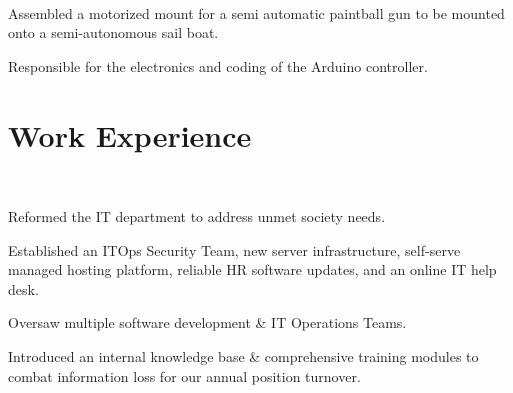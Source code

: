 \documentclass[]{hieudo-build}
\begin{document}
\begin{minipage}[t]{0.69\textwidth}
 \\
\begin{tightemize}
\item Assembled a motorized mount for a semi automatic paintball gun to be mounted onto a semi-autonomous sail boat.
\item Responsible for the electronics and coding of the Arduino controller.
\end{tightemize}
\sectionsep



\section{Work Experience}

 \\
\begin{tightemize} 
\item Reformed the IT department to address unmet society needs.
\item Established an ITOps Security Team, new server infrastructure, self-serve managed hosting platform, reliable HR software updates, and an online IT help desk.
\item Oversaw multiple software development \& IT Operations Teams.
\item Introduced an internal knowledge base \& comprehensive training modules to combat information loss for our annual position turnover.
\end{tightemize}
\sectionsep


\end{minipage}
\end{document}
